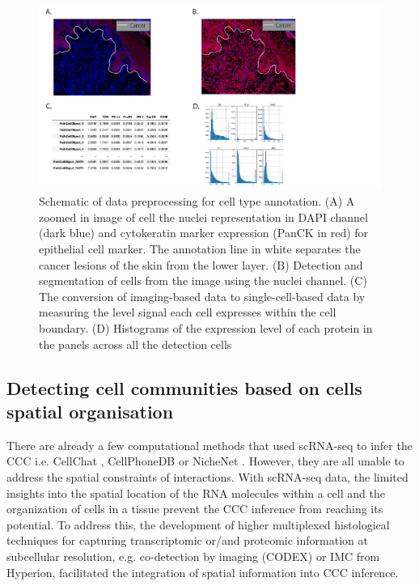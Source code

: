 \begin{figure}[htp]
    \centering
    \includegraphics[width=\columnwidth]{Chapter3/Figures/Cell_identification_skin_cancer-01.png}
    \caption{Schematic of data preprocessing for cell type annotation. (A) A zoomed in image of cell the nuclei representation in DAPI channel (dark blue) and cytokeratin marker expression (PanCK in red) for epithelial cell marker. The annotation line in white separates the cancer lesions of the skin from the lower layer. (B) Detection and segmentation of cells from the image using the nuclei channel. (C) The conversion of imaging-based data to single-cell-based data by measuring the level signal each cell expresses within the cell boundary. (D) Histograms of the expression level of each protein in the panels across all the detection cells}
    \label{fig:Polaris_skin_cancer_cell_iden}
\end{figure}

\subsection{Detecting cell communities based on cells spatial organisation}
There are already a few computational methods that used scRNA-seq to infer the CCC i.e. CellChat \cite{jin2021CellChat}, CellPhoneDB \cite{efremova2020cellphonedb} or NicheNet \cite{browaeys2020nichenet}. However, they are all unable to address the spatial constraints of interactions. With scRNA-seq data, the limited insights into the spatial location of the RNA molecules within a cell and the organization of cells in a tissue prevent the CCC inference from reaching its potential. To address this, the development of higher multiplexed histological techniques for capturing transcriptomic or/and proteomic information at subcellular resolution, e.g. co-detection by imaging (CODEX) \cite{goltsev2018CODEX} or IMC from Hyperion, facilitated the integration of spatial information into CCC inference. 

